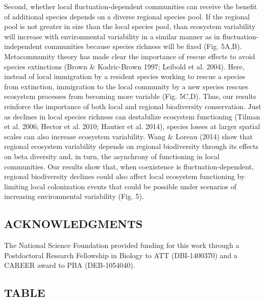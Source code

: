 \documentclass[12pt,]{article}
\begin{document}
Second, whether local fluctuation-dependent communities can receive the
benefit of additional species depends on a diverse regional species
pool. If the regional pool is not greater in size than the local species
pool, than ecosystem variability will increase with environmental
variability in a similar manner as in fluctuation-independent
communities because species richness will be fixed (Fig. 5A,B).
Metacommunity theory has made clear the importance of rescue effects to
avoid species extinctions (Brown \& Kodric-Brown 1997; Leibold et al.
2004). Here, instead of local immigration by a resident species working
to rescue a species from extinction, immigration to the local community
by a new species rescues ecosystem processes from becoming more variable
(Fig. 5C,D). Thus, our results reinforce the importance of both local
and regional biodiversity conservation. Just as declines in local
species richness can destabilize ecosystem functioning (Tilman et al.
2006; Hector et al. 2010; Hautier et al. 2014), species losses at larger
spatial scales can also increase ecosystem variability. Wang \& Loreau
(2014) show that regional ecosystem variability depends on regional
biodiversity through its effects on beta diversity and, in turn, the
asynchrony of functioning in local communities. Our results show that,
when coexistence is fluctuation-dependent, regional biodiversity
declines could also affect local ecosystem functioning by limiting local
colonization events that could be possible under scenarios of increasing
environmental variability (Fig. 5).

\subsection{ACKNOWLEDGMENTS}\label{acknowledgments}

The National Science Foundation provided funding for this work through a
Postdoctoral Research Fellowship in Biology to ATT (DBI-1400370) and a
CAREER award to PBA (DEB-1054040).

\newpage{}

\subsection{TABLE}\label{table}
\end{document}
